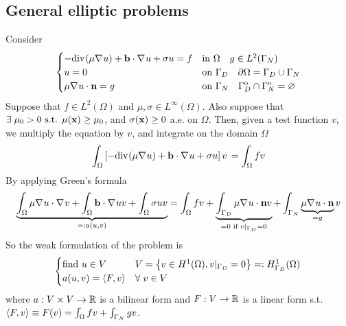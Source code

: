 \subsection*{General elliptic problems}
Consider 
\begin{equation}
    \begin{cases}
        -\text{div}\mspace{1mu}(\mu \nabla\mspace{1mu} u)+ \textbf{b}\cdot \nabla\mspace{1mu} u + \sigma u = f& \text{in } \Omega \quad g \in L^2(\Gamma_N) \\
        u = 0 & \text{on }\Gamma_D \quad \partial\Omega = \Gamma_D \cup \Gamma_N \\

        \mu \nabla\mspace{1mu} u \cdot \textbf{n} = g & \text{on } \Gamma_N \quad {\kern0pt\Gamma}^{\mathrm{o}}_D \cap {\kern0pt\Gamma}^{\mathrm{o}}_N = \varnothing
    \end{cases}
\end{equation}
Suppose that \(f \in L^2(\Omega)\) and \(\mu, \sigma \in L^\infty(\Omega)\). Also suppose that \(\exists \; \mu_0 > 0 \text{ s.t. } \mu(\textbf{x}) \geq \mu_0\), and \(\sigma(\textbf{x}) \geq 0\) a.e. on \(\Omega\).  
Then, given a test function \(v\), we multiply the equation by \(v\), and integrate on the domain \(\Omega\)
\begin{equation*}
    \int_\Omega \left[-\text{div}\mspace{1mu}(\mu \nabla\mspace{1mu} u)+ \textbf{b}\cdot \nabla\mspace{1mu} u + \sigma u\right] v \,  = \int_\Omega f v 
\end{equation*}
By applying Green's formula 
\begin{equation*}
    \underbrace{\int_\Omega \mu\nabla\mspace{1mu} u \cdot \nabla\mspace{1mu} v  + \int_\Omega \textbf{b} \cdot \nabla\mspace{1mu} u v + \int_\Omega \sigma u v}_{=: a(u,v)} = \int_\Omega f v +\underbrace{\int_{\Gamma_D} \mu \nabla\mspace{1mu} u \cdot \textbf{n} v}_{= 0 \text{ if } v\vert_{\Gamma_D} = 0} + \int_{\Gamma_N} \underbrace{\mu \nabla\mspace{1mu} u \cdot \textbf{n}}_{= g} v 
\end{equation*}
So the weak formulation of the problem is 
\begin{equation}
    \begin{cases}
        \text{find } u \in V & V = \left\{v \in H^1(\Omega), v\vert_{\Gamma_D} = 0\right\} =: H^1_{\Gamma_D}(\Omega)\\
        a(u,v) = \langle F,v \rangle & \forall \; v \in V \label{Weak Formulation of Boundary Value Problems}
    \end{cases}
\end{equation}
where \(a: V \times V \to \mathbb{R}\) is a bilinear form and \(F:V \to \mathbb{R}\) is a linear form s.t. \(\langle F,v \rangle \equiv F(v) = \int_\Omega fv + \int_{\Gamma_N} gv\).
